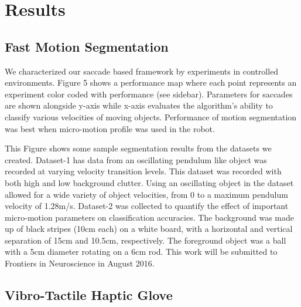 \chapter{Results }
\section{Fast Motion Segmentation}
We characterized our saccade based framework by experiments in
controlled environments. Figure 5 shows a performance map where each
point represents an experiment color coded with performance (see
sidebar). Parameters for saccades are shown alongside y-axis while
x-axis evaluates the algorithm’s ability to classify various
velocities of moving objects. Performance of motion segmentation was
best when micro-motion profile was used in the robot.

This Figure shows some sample segmentation results from the datasets
we created. Dataset-1 has data from an oscillating pendulum like
object was recorded at varying velocity transition levels. This
dataset was recorded with both high and low background clutter. Using
an oscillating object in the dataset allowed for a wide variety of
object velocities, from 0 to a maximum pendulum velocity of
1.28m/s. Dataset-2 was collected to quantify the effect of important
micro-motion parameters on classification accuracies. The background
was made up of black stripes (10cm each) on a white board, with a
horizontal and vertical separation of 15cm and 10.5cm,
respectively. The foreground object was a ball with a 5cm diameter
rotating on a 6cm rod. This work will be submitted to Frontiers in
Neuroscience in August 2016.

\section{Vibro-Tactile Haptic Glove}

